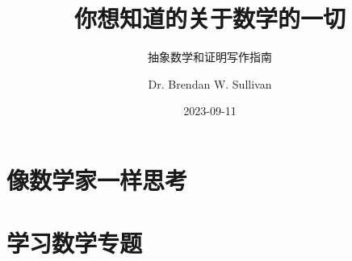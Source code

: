 \documentclass[lang=cn,color=green,10pt]{elegantbook}
\title{你想知道的关于数学的一切}
\subtitle{抽象数学和证明写作指南}
\author{Dr. Brendan W. Sullivan}
\date{2023-09-11}
\begin{document}
\maketitle
\frontmatter

\tableofcontents

\mainmatter

\part{像数学家一样思考}





\part{学习数学专题}


\end{document}
